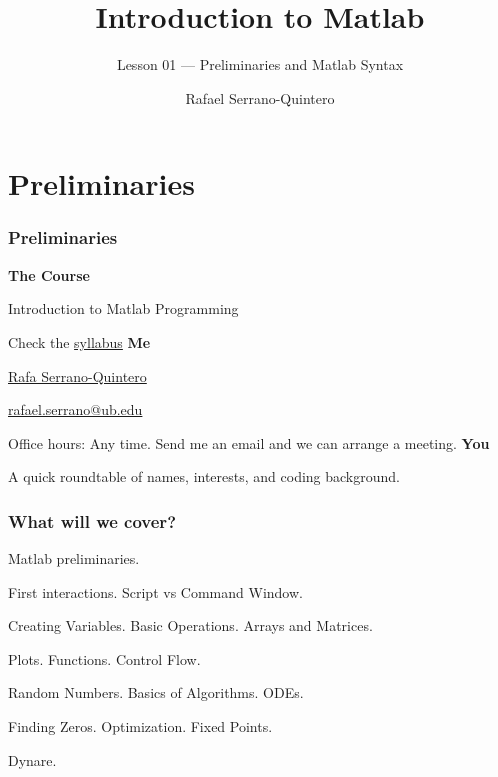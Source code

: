 \documentclass[11pt,xcolor={svgnames},aspectratio=169,usepdftitle=false]{beamer}
\title{Introduction to Matlab}
\subtitle{Lesson 01 --- Preliminaries and Matlab Syntax}
\author{Rafael Serrano-Quintero}
\institute{Department of Economics \\ University of Barcelona}
\date{}
\let\toneitemize\itemize
\let\ttwoitemize\enditemize
\renewenvironment{itemize}{\toneitemize\addtolength{\itemsep}{1.35\baselineskip}}{\ttwoitemize}
\let\toneenumer\enumerate
\let\ttwoenumer\endenumerate
\renewenvironment{enumerate}{\toneenumer\addtolength{\itemsep}{1.35\baselineskip}}{\ttwoenumer}
\begin{document}
\VerbatimFootnotes

\maketitle

\section{Preliminaries}

\begin{frame}
    \frametitle{Preliminaries}
    \textbf{\alert{The Course}}
    \begin{itemize}
        \item Introduction to Matlab Programming
        \item Check the \href{run:../syllabus/syllabus.pdf}{syllabus}
    \end{itemize}
    \textbf{\alert{Me}}
    \begin{itemize}
        \item \href{rafserqui.github.io}{Rafa Serrano-Quintero} 
        \item \href{mailto:rafael.serrano@ub.edu}{rafael.serrano@ub.edu}
        \item Office hours: Any time. Send me an email and we can arrange a meeting.
    \end{itemize}
    \textbf{\alert{You}}
    \begin{itemize}
        \item A quick roundtable of names, interests, and coding background.
    \end{itemize}
\end{frame}

\begin{frame}
    \frametitle{What will we cover?}
    \begin{enumerate}
        \item Matlab preliminaries. 
        \begin{itemize}
            \item First interactions. Script vs Command Window.
            \item Creating Variables. Basic Operations. Arrays and Matrices.
            \item Plots. Functions. Control Flow.
        \end{itemize}
        \item Random Numbers. Basics of Algorithms. ODEs.
        \item Finding Zeros. Optimization. Fixed Points.
        \item Dynare.
    \end{enumerate}
\end{frame}
\end{document}
